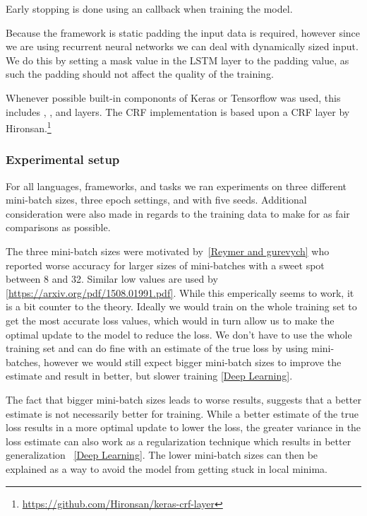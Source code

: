 Early stopping is done using an  callback when training the
model.

Because the framework is static padding the input data is required, however
since we are using recurrent neural networks we can deal with dynamically sized
input. We do this by setting a mask value in the LSTM layer to the padding
value, as such the padding should not affect the quality of the training.

Whenever possible built-in compononts of Keras or Tensorflow was used, this
includes , ,  and  layers.
The CRF implementation is based upon a CRF layer by
Hironsan.\footnote{\url{https://github.com/Hironsan/keras-crf-layer}}

\subsubsection{Experimental setup}

For all languages, frameworks, and tasks we ran experiments on three different
mini-batch sizes, three epoch settings, and with five seeds. Additional
consideration were also made in regards to the training data to make for as fair
comparisons as possible.

The three mini-batch sizes were motivated by~\ref{Reymer and gurevych} who
reported worse accuracy for larger sizes of mini-batches with a sweet spot
between 8 and 32. Similar low values are used by
\ref{https://arxiv.org/pdf/1508.01991.pdf}. While this emperically seems to
work, it is a bit counter to the theory. Ideally we would train on the whole
training set to get the most accurate loss values, which would in turn allow us
to make the optimal update to the model to reduce the loss. We don't have to use
the whole training set and can do fine with an estimate of the true loss by
using mini-batches, however we would still expect bigger mini-batch sizes to
improve the estimate and result in better, but slower training \ref{Deep
Learning}. 

The fact that bigger mini-batch sizes leads to worse results, suggests that a
better estimate is not necessarily better for training. While a better estimate
of the true loss results in a more optimal update to lower the loss, the greater
variance in the loss estimate can also work as a regularization technique which
results in better generalization ~\ref{Deep Learning}. The lower mini-batch
sizes can then be explained as a way to avoid the model from getting stuck in
local minima.


